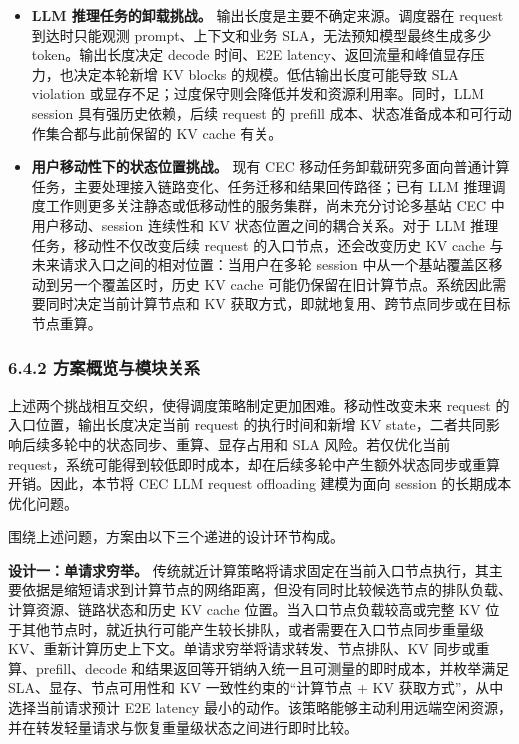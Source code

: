 \begin{itemize}
    \item \textbf{LLM 推理任务的卸载挑战。} 输出长度是主要不确定来源。调度器在 request 到达时只能观测 prompt、上下文和业务 SLA，无法预知模型最终生成多少 token。输出长度决定 decode 时间、E2E latency、返回流量和峰值显存压力，也决定本轮新增 KV blocks 的规模。低估输出长度可能导致 SLA violation 或显存不足；过度保守则会降低并发和资源利用率。同时，LLM session 具有强历史依赖，后续 request 的 prefill 成本、状态准备成本和可行动作集合都与此前保留的 KV cache 有关。
    \item \textbf{用户移动性下的状态位置挑战。} 现有 CEC 移动任务卸载研究多面向普通计算任务，主要处理接入链路变化、任务迁移和结果回传路径；已有 LLM 推理调度工作则更多关注静态或低移动性的服务集群，尚未充分讨论多基站 CEC 中用户移动、session 连续性和 KV 状态位置之间的耦合关系。对于 LLM 推理任务，移动性不仅改变后续 request 的入口节点，还会改变历史 KV cache 与未来请求入口之间的相对位置：当用户在多轮 session 中从一个基站覆盖区移动到另一个覆盖区时，历史 KV cache 可能仍保留在旧计算节点。系统因此需要同时决定当前计算节点和 KV 获取方式，即就地复用、跨节点同步或在目标节点重算。
\end{itemize}

\subsubsection*{6.4.2 方案概览与模块关系}

上述两个挑战相互交织，使得调度策略制定更加困难。移动性改变未来 request 的入口位置，输出长度决定当前 request 的执行时间和新增 KV state，二者共同影响后续多轮中的状态同步、重算、显存占用和 SLA 风险。若仅优化当前 request，系统可能得到较低即时成本，却在后续多轮中产生额外状态同步或重算开销。因此，本节将 CEC LLM request offloading 建模为面向 session 的长期成本优化问题。

围绕上述问题，方案由以下三个递进的设计环节构成。

\noindent\textbf{设计一：单请求穷举。}
传统就近计算策略将请求固定在当前入口节点执行，其主要依据是缩短请求到计算节点的网络距离，但没有同时比较候选节点的排队负载、计算资源、链路状态和历史 KV cache 位置。当入口节点负载较高或完整 KV 位于其他节点时，就近执行可能产生较长排队，或者需要在入口节点同步重量级 KV、重新计算历史上下文。单请求穷举将请求转发、节点排队、KV 同步或重算、prefill、decode 和结果返回等开销纳入统一且可测量的即时成本，并枚举满足 SLA、显存、节点可用性和 KV 一致性约束的“计算节点 + KV 获取方式”，从中选择当前请求预计 E2E latency 最小的动作。该策略能够主动利用远端空闲资源，并在转发轻量请求与恢复重量级状态之间进行即时比较。

